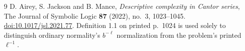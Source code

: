 \documentclass[10pt,a4paper]{article}
\begin{document}
\begin{thebibliography}{9}
 D. Airey, S. Jackson and B. Mance,
\emph{Descriptive complexity in Cantor series},
The Journal of Symbolic Logic \textbf{87} (2022), no.~3, 1023--1045.
\href{https://doi.org/10.1017/jsl.2021.77}{doi:10.1017/jsl.2021.77}.
Definition 1.1 on printed p.~1024 is used solely to distinguish ordinary
normality's $b^{-\ell}$ normalization from the problem's printed $\ell^{-1}$.
\end{thebibliography}
\end{document}
